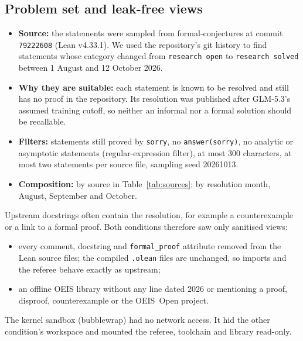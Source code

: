 \documentclass[11pt]{article}
\begin{document}
\subsection{Problem set and leak-free views}
\begin{itemize}
  \item \textbf{Source:} the \CSsevenN{} statements were sampled from formal-conjectures at commit \texttt{79222608}
    (Lean v4.33.1). We used the repository's git history to find statements whose category changed from
    \texttt{research open} to \texttt{research solved} between 1 August and 12 October 2026.
  \item \textbf{Why they are suitable:} each statement is known to be resolved and still has no proof in the
    repository. Its resolution was published after GLM-5.3's assumed training cutoff, so neither an informal nor a
    formal solution should be recallable.
  \item \textbf{Filters:} statements still proved by \texttt{sorry}, no \texttt{answer(sorry)}, no analytic or
    asymptotic statements (regular-expression filter), at most 300 characters, at most two statements per source file,
    sampling seed 20261013.
  \item \textbf{Composition:} by source in Table~\ref{tab:sources}; by resolution month, \CSsevenAugN{} August,
    \CSsevenSepN{} September and \CSsevenOctN{} October.
\end{itemize}

Upstream docstrings often contain the resolution, for example a counterexample or a link to a formal proof. Both
conditions therefore saw only sanitised views:
\begin{itemize}
  \item every comment, docstring and \texttt{formal\_proof} attribute removed from the \LeanFiles{} Lean source files; the
    compiled \texttt{.olean} files are unchanged, so imports and the referee behave exactly as upstream;
  \item an offline OEIS library without any line dated 2026 or mentioning a proof, disproof, counterexample or the
    OEIS~Open project.
\end{itemize}
The kernel sandbox (bubblewrap) had no network access. It hid the other condition's workspace and mounted the referee,
toolchain and library read-only.
\end{document}
